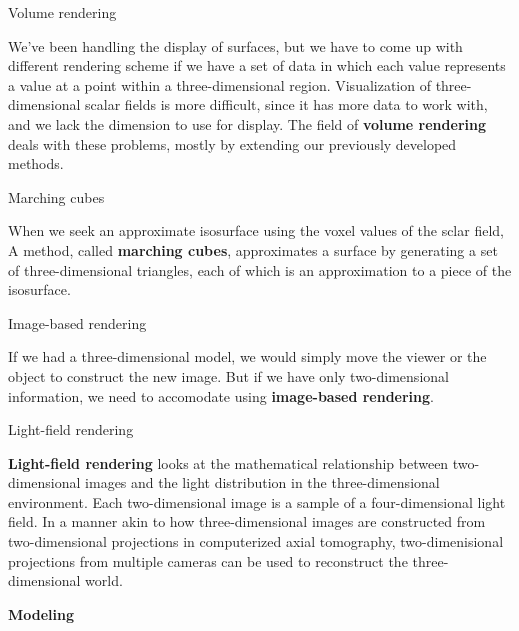 \documentclass[10pt,a4paper]{article}
\begin{document}
\begin{enumerate}
		{\large \item Volume rendering}
		
		We've been handling the display of surfaces, but we have to come up with different rendering scheme if we have a set of data in which each value represents a value at a point within a three-dimensional region. Visualization of three-dimensional scalar fields is more difficult, since it has more data to work with, and we lack the dimension to use for display. The field of \textbf{volume rendering} deals with these problems, mostly by extending our previously developed methods.\\
		
		{\large \item Marching cubes}
		
		When we seek an approximate isosurface using the voxel values of the sclar field, A method, called \textbf{marching cubes}, approximates a surface by generating a set of three-dimensional triangles, each of which is an approximation to a piece of the isosurface.\\
		
		{\large \item Image-based rendering}
		
		If we had a three-dimensional model, we would simply move the viewer or the object to construct the new image. But if we have only two-dimensional information, we need to accomodate using \textbf{image-based rendering}.\\
		
		{\large \item Light-field rendering}
		
		\textbf{Light-field rendering} looks at the mathematical relationship between two-dimensional images and the light distribution in the three-dimensional environment. Each two-dimensional image is a sample of a four-dimensional light field. In a manner akin to how three-dimensional images are constructed from two-dimensional projections in computerized axial tomography, two-dimenisional projections from multiple cameras can be used to reconstruct the three-dimensional world.\\
		
	\end{enumerate}
	\pagebreak
	{\Large \textbf{Modeling}}
	
\end{document}

